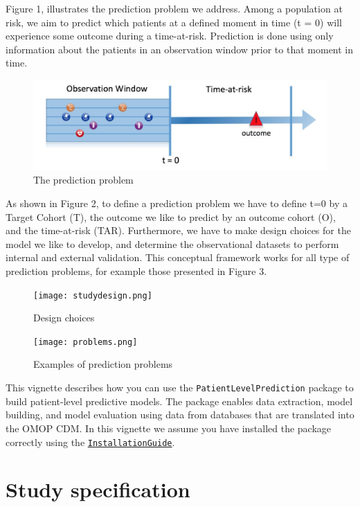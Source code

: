 \documentclass[]{article}
\begin{document}
Figure 1, illustrates the prediction problem we address. Among a
population at risk, we aim to predict which patients at a defined moment
in time (t = 0) will experience some outcome during a time-at-risk.
Prediction is done using only information about the patients in an
observation window prior to that moment in time.

\begin{figure}
\centering
\includegraphics{Figure1.png}
\caption{The prediction problem}
\end{figure}

As shown in Figure 2, to define a prediction problem we have to define
t=0 by a Target Cohort (T), the outcome we like to predict by an outcome
cohort (O), and the time-at-risk (TAR). Furthermore, we have to make
design choices for the model we like to develop, and determine the
observational datasets to perform internal and external validation. This
conceptual framework works for all type of prediction problems, for
example those presented in Figure 3.

\begin{figure}
\centering
\texttt{[image: studydesign.png]}
\caption{Design choices}
\end{figure}

\begin{figure}
\centering
\texttt{[image: problems.png]}
\caption{Examples of prediction problems}
\end{figure}

This vignette describes how you can use the
\texttt{PatientLevelPrediction} package to build patient-level
predictive models. The package enables data extraction, model building,
and model evaluation using data from databases that are translated into
the OMOP CDM. In this vignette we assume you have installed the package
correctly using the
\href{https://github.com/OHDSI/PatientLevelPrediction/blob/master/inst/doc/InstallationGuide.pdf}{\texttt{InstallationGuide}}.

\section{Study specification}\label{study-specification}
\end{document}
